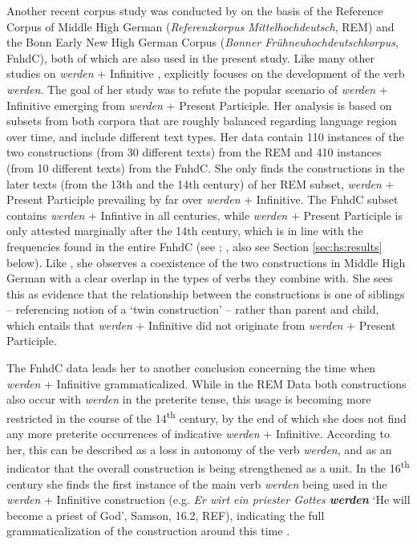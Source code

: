 \documentclass[output=paper,colorlinks,citecolor=brown]{langscibook}
\begin{document}
Another recent corpus study was conducted by \citet{concu_werden_2022} on the basis of the Reference Corpus of Middle High German (\textit{Referenzkorpus Mittelhochdeutsch}, REM) and the Bonn Early New High German Corpus (\textit{Bonner Frühneuhochdeutschkorpus}, FnhdC), both of which are also used in the present study. Like many other studies on \textit{werden} + Infinitive \citep[e.g.][]{Kotin2003}, \citet[][29]{concu_werden_2022} explicitly focuses on the development of the verb \textit{werden}.  The goal of her study was to refute the popular scenario of \textit{werden} + Infinitive emerging from \textit{werden} + Present Participle. Her analysis is based on subsets from both corpora that are roughly balanced regarding language region over time, and include different text types. Her data contain 110 instances of the two constructions (from 30 different texts) from the REM and 410 instances (from 10 different texts) from the FnhdC. She only finds the constructions in the later texts (from the 13th and the 14th century) of her REM subset, \textit{werden} + Present Participle prevailing by far over \textit{werden} + Infinitive. The FnhdC subset contains \textit{werden} + Infintive in all centuries, while \textit{werden} + Present Participle is only attested marginally after the 14th century, which is in line with the frequencies found in the entire FnhdC (see \cite{Hartmann2021}; \citeauthor{hartmannFuturkonstruktionenImWandel2023} \citeyear{hartmannFuturkonstruktionenImWandel2023}, also see Section \ref{sec:hs:results} below).  Like \citet[][]{Hartmann2021}, she observes a coexistence of the two constructions in Middle High German with a clear overlap in the types of verbs they combine with. She sees this as evidence that the relationship between the constructions is one of siblings -- referencing  notion of a `twin construction' -- rather than parent and child, which entails that \textit{werden} + Infinitive did not originate from \textit{werden} + Present Participle.  

The FnhdC data leads her to another conclusion concerning the time when \textit{werden} + Infinitive grammaticalized. While in the REM Data both constructions also occur with \textit{werden} in the preterite tense, this usage is becoming more restricted in the course of the 14\textsuperscript{th} century, by the end of which she does not find any more preterite occurrences of indicative \textit{werden} + Infinitive. According to her, this can be described as a loss in autonomy of the verb \textit{werden}, and as an indicator that the overall construction is being strengthened as a unit. In the 16\textsuperscript{th} century she finds the first instance of the main verb \textit{werden} being used in the \textit{werden} + Infinitive construction (e.g. \textit{Er wirt ein priester Gottes \textbf{werden}} `He will become a priest of God', Samson, 16.2, REF), indicating the full grammaticalization of the construction around this time \citep[see also][17]{Schmid2000}.
\end{document}
